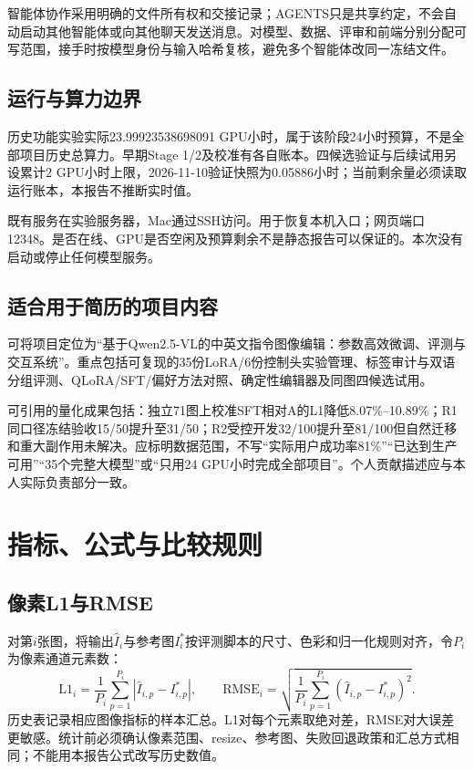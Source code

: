 \documentclass[UTF8,fontset=none,zihao=5,a4paper]{ctexart}
\begin{document}
智能体协作采用明确的文件所有权和交接记录；AGENTS只是共享约定，不会自动启动其他智能体或向其他聊天发送消息。对模型、数据、评审和前端分别分配可写范围，接手时按模型身份与输入哈希复核，避免多个智能体改同一冻结文件。

\subsection{运行与算力边界}
历史功能实验实际23.99923538698091 GPU小时，属于该阶段24小时预算，不是全部项目历史总算力。早期Stage 1/2及校准有各自账本。四候选验证与后续试用另设累计2 GPU小时上限，2026-11-10验证快照为0.05886小时；当前剩余量必须读取运行账本，本报告不推断实时值。

既有服务在实验服务器，Mac通过SSH访问。用于恢复本机入口；网页端口12348。是否在线、GPU是否空闲及预算剩余不是静态报告可以保证的。本次没有启动或停止任何模型服务。

\subsection{适合用于简历的项目内容}
可将项目定位为“基于Qwen2.5-VL的中英文指令图像编辑：参数高效微调、评测与交互系统”。重点包括可复现的35份LoRA/6份控制头实验管理、标签审计与双语分组评测、QLoRA/SFT/偏好方法对照、确定性编辑器及同图四候选试用。

可引用的量化成果包括：独立71图上校准SFT相对A的L1降低8.07\%--10.89\%；R1同口径冻结验收15/50提升至31/50；R2受控开发32/100提升至81/100但自然迁移和重大副作用未解决。应标明数据范围，不写“实际用户成功率81\%”“已达到生产可用”“35个完整大模型”或“只用24 GPU小时完成全部项目”。个人贡献描述应与本人实际负责部分一致。
\clearpage

\appendix
\section{指标、公式与比较规则}
\subsection{像素L1与RMSE}
对第$i$张图，将输出$\hat I_i$与参考图$I_i^*$按评测脚本的尺寸、色彩和归一化规则对齐，令$P_i$为像素通道元素数：
\[
\mathrm{L1}_i=\frac1{P_i}\sum_{p=1}^{P_i}|\hat I_{i,p}-I^*_{i,p}|,
\qquad
\mathrm{RMSE}_i=\sqrt{\frac1{P_i}\sum_{p=1}^{P_i}(\hat I_{i,p}-I^*_{i,p})^2}.
\]
历史表记录相应图像指标的样本汇总。L1对每个元素取绝对差，RMSE对大误差更敏感。统计前必须确认像素范围、resize、参考图、失败回退政策和汇总方式相同；不能用本报告公式改写历史数值。
\end{document}
